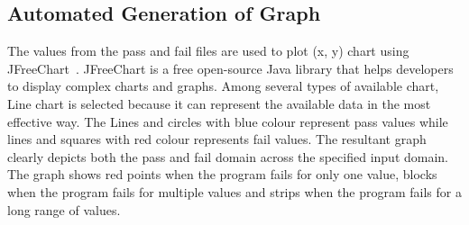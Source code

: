 \subsection{Automated Generation of Graph}
The values from the pass and fail files are used to plot (x, y) chart using JFreeChart~\cite{gilbert2008jfreechart}. JFreeChart is a free open-source Java library that helps developers to display complex charts and graphs. Among several types of available chart, Line chart is selected because it can represent the available data in the most effective way. The Lines and circles with blue colour represent pass values while lines and squares with red colour represents fail values. The resultant graph clearly depicts both the pass and fail domain across the specified input domain. The graph shows red points when the program fails for only one value, blocks when the program fails for multiple values and strips when the program fails for a long range of values.%












